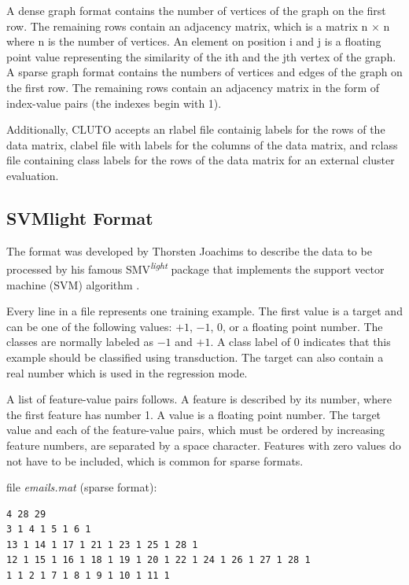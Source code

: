 A dense graph format contains the number of vertices of the graph on the first
row. The remaining rows contain an adjacency matrix, which is a matrix n × n
where n is the number of vertices. An element on position i and j is a floating
point value representing the similarity of the ith and the jth vertex of the graph.
A sparse graph format contains the numbers of vertices and edges of the graph
on the first row. The remaining rows contain an adjacency matrix in the form of
index-value pairs (the indexes begin with 1).

Additionally, CLUTO accepts an rlabel file containig labels for the rows of
the data matrix, clabel file with labels for the columns of the data matrix, and
rclass file containing class labels for the rows of the data matrix for an external
cluster evaluation.

\subsection{SVMlight Format}

The format was developed by Thorsten Joachims to describe the data to be processed by his famous SMV\textsuperscript{\textit{light}} package that implements the support vector machine (SVM) algorithm \cite{ref135}.

Every line in a file represents one training example. The first value is a target
and can be one of the following values: $+1$, $-1$, $0$, or a floating point number.
The classes are normally labeled as $-1$ and $+1$. A class label of $0$ indicates that
this example should be classified using transduction. The target can also contain
a real number which is used in the regression mode.

A list of feature-value pairs follows. A feature is described by its number,
where the first feature has number 1. A value is a floating point number. The
target value and each of the feature-value pairs, which must be ordered by increasing feature numbers, are separated by a space character. Features with zero
values do not have to be included, which is common for sparse formats.

\begin{center}
file \textit{emails.mat} (sparse format):
\end{center}

\begin{verbatim}
4 28 29
3 1 4 1 5 1 6 1
13 1 14 1 17 1 21 1 23 1 25 1 28 1
12 1 15 1 16 1 18 1 19 1 20 1 22 1 24 1 26 1 27 1 28 1
1 1 2 1 7 1 8 1 9 1 10 1 11 1
\end{verbatim}

